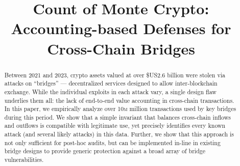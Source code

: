 \documentclass[conference,compsoc]{IEEEtran}
\newcommand{\mil}{\textsc{m}\xspace}
\begin{document}
\title{Count of Monte Crypto: Accounting-based Defenses for Cross-Chain Bridges} %





\iffalse
\newcommand{\alex}[1]{\textcolor{red}{\noindent[AL: #1]}}
\newcommand{\elisa}[1]{\textcolor{blue}{\noindent[EL: #1]}}
\newcommand{\geoff}[1]{\textcolor{teal}{[GV: #1]}}
\newcommand{\deian}[1]{\textcolor{green}{[ds: #1]}}
\else
\newcommand{\alex}[1]{}
\newcommand{\elisa}[1]{}
\newcommand{\geoff}[1]{}
\newcommand{\deian}[1]{}
\fi

\maketitle

\begin{abstract}
Between 2021 and 2023, crypto assets valued at over \$US2.6 billion
were stolen via attacks on ``bridges'' --- decentralized services
designed to allow inter-blockchain exchange.  While the individual
exploits in each attack vary, a single design flaw underlies them all:
the lack of end-to-end value accounting in cross-chain transactions.
In this paper, we empirically analyze over 10\mil million transactions used
by key bridges during this period.  We show that a simple invariant
that balances cross-chain inflows and outflows is compatible with
legitimate use, yet precisely identifies every known attack (and
several likely attacks) in this data.  Further, we show that this
approach is not only sufficient for post-hoc audits, but can be
implemented in-line in existing bridge designs to provide generic
protection against a broad array of bridge vulnerabilities.
\end{abstract}



% 



%














%





% 

% 

% 

% 
% 



% 


\newpage


\clearpage

\end{document}
